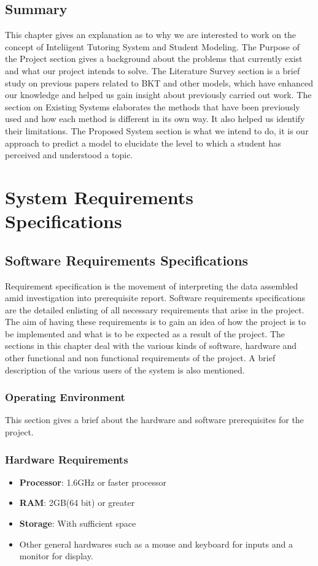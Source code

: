 \documentclass[12pt,a4paper,oneside]{report}
\begin{document}
\section{Summary}
This chapter gives an explanation as to why we are interested to work on the concept of Inteliigent Tutoring System and Student Modeling.
The Purpose of the Project section gives a background about the problems that currently exist and what our project intends to solve.
The Literature Survey section is a brief study on previous papers related to BKT and other models, which have enhanced our knowledge and helped us gain insight about previously carried out work.
The section on Existing Systems elaborates the methods that have been previously used and how each method is different in its own way. It also helped us identify their limitations.
The Proposed System section is what we intend to do, it is our approach to predict a model to elucidate the level to which a student has perceived and understood a topic.
\chapter{System Requirements Specifications}
\section{Software Requirements Specifications}
Requirement specification is the movement of interpreting the data assembled 
amid investigation into prerequisite report. 
\newline
Software requirements specifications are the detailed enlisting of all necessary requirements that arise in the project. The aim of having these requirements is to gain an idea of how the project is to be implemented and what is to be expected as a result of the project. The sections in this chapter deal with the various kinds of software, hardware and other functional and non functional requirements of the project. A brief description of the various users of the system is also mentioned.
\subsection{Operating Environment}
This section gives a brief about the hardware and software prerequisites for the project.
\subsection*{Hardware Requirements}
\begin{itemize}
\item \textbf{Processor}: 1.6GHz or faster processor
\item \textbf{RAM}: 2GB(64 bit) or greater
\item \textbf{Storage}: With sufficient space
\item Other general hardwares such as a mouse and keyboard for inputs and a monitor for display.
\end{itemize}
\end{document}
